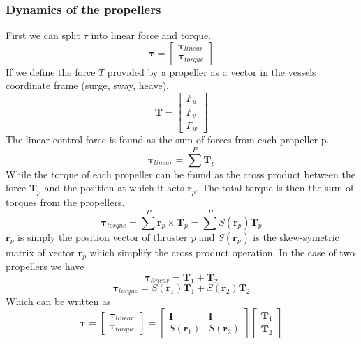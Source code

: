 \documentclass[12pt,a4]{article}
\begin{document}
\subsubsection{Dynamics of the propellers}
First we can split $\tau$ into linear force and torque.
\begin{equation}
	\bm{\tau} = \begin{bmatrix}
		\bm{\tau}_{linear} \\
		\bm{\tau}_{torque}
	\end{bmatrix}
\end{equation}
If we define the force $T$ provided by a propeller as a vector in the vessels coordinate frame (surge, sway, heave).
\begin{equation}
	\bm{T} = \begin{bmatrix} F_u \\ F_v \\ F_w \end{bmatrix}
\end{equation}
The linear control force is found as the sum of forces from each propeller p.
\begin{equation}
	\bm{\tau}_{linear} = \sum^P \bm{T}_p
\end{equation}
While the torque of each propeller can be found as the cross product between the force $\bm{T}_p$ and the position at which it acts $\bm{r}_p$.
The total torque is then the sum of torques from the propellers.
\begin{equation}
	\bm{\tau}_{torque} = \sum^P  \bm{r}_p \times \bm{T}_p = \sum^P S(\bm{r}_p) \bm{T}_p
\end{equation}
$\bm{r}_p$ is simply the position vector of thruster \textit{p} and $S(\bm{r}_p)$ is the skew-symetric matrix of vector $\bm{r}_p$
which simplify the cross product operation. In the case of two propellers we have
\begin{equation}
	\bm{\tau}_{linear} = \bm{T}_1 + \bm{T}_2
\end{equation}
\begin{equation}
	\bm{\tau}_{torque} = S(\bm{r}_1)\bm{T}_1+ S(\bm{r}_2)\bm{T}_2
\end{equation}
Which can be written as
\begin{equation}\label{eq:CA_matrix}
	\bm{\tau} = \begin{bmatrix}		\bm{\tau}_{linear} \\		\bm{\tau}_{torque}	\end{bmatrix}
	=\begin{bmatrix} \bm{I} & \bm{I} \\ S(\bm{r}_1) & S(\bm{r}_2) \end{bmatrix}\begin{bmatrix} \bm{T}_1 \\ \bm{T}_2 \end{bmatrix}
\end{equation}
\end{document}
